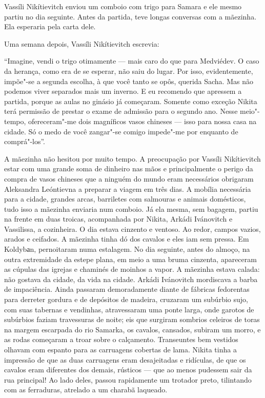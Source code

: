 Vassíli Nikítievitch enviou um comboio com trigo para Samara e ele mesmo
partiu no dia seguinte. Antes da partida, teve longas conversas com a
mãezinha. Ela esperaria pela carta dele.

Uma semana depois, Vassíli Nikítievitch escrevia:

``Imagine, vendi o trigo otimamente --- mais caro do que para Medviédev.
O caso da herança, como era de se esperar, não saiu do lugar. Por isso,
evidentemente, impõe"-se a segunda escolha, à que você tanto se opôs,
querida Sacha. Mas não podemos viver separados mais um inverno. E eu
recomendo que apressem a partida, porque as aulas no ginásio já
começaram. Somente como exceção Nikita terá permissão de prestar o exame
de admissão para o segundo ano. Nesse meio"-tempo, ofereceram"-me dois
magníficos vasos chineses --- isso para nossa casa na cidade. Só
o medo de você zangar"-se comigo impede"-me por enquanto de comprá"-los''.

A mãezinha não hesitou por muito tempo. A preocupação por Vassíli
Nikítievitch estar com uma grande soma de dinheiro nas mãos e
principalmente o perigo da compra de vasos chineses que a ninguém do
mundo eram necessários obrigaram Aleksandra Leóntievna a preparar a
viagem em três dias. A mobília necessária para a cidade, grandes arcas,
barriletes com salmouras e animais domésticos, tudo isso a mãezinha
enviaria num comboio. Já ela mesma, sem bagagem, partiu na frente em
duas troicas, acompanhada por Nikita, Arkádi Ivánovitch e Vassilissa, a
cozinheira. O dia estava cinzento e ventoso. Ao redor, campos vazios,
arados e ceifados. A mãezinha tinha dó dos cavalos e eles iam sem
pressa. Em Koldybаn, pernoitaram numa estalagem. No dia seguinte, antes
do almoço, na outra extremidade da estepe plana, em meio a uma bruma
cinzenta, apareceram as cúpulas das igrejas e chaminés de moinhos a
vapor. A mãezinha estava calada: não gostava da cidade, da vida na
cidade. Arkádi Ivánovitch mordiscava a barba de impaciência. Ainda
passaram demoradamente diante de fábricas fedorentas para derreter
gordura e de depósitos de madeira, cruzaram um subúrbio sujo, com
suas tabernas e vendinhas, atravessaram uma ponte larga, onde garotos de
subúrbios faziam travessuras de noite; eis que surgiram sombrios celeiros de
toras na margem escarpada do rio Samarka, os cavalos, cansados,
subiram um morro, e as rodas começaram a troar sobre o calçamento.
Transeuntes bem vestidos olhavam com espanto para as carruagens cobertas
de lama. Nikita tinha a impressão de que as duas carruagens eram
desajeitadas e ridículas, de que os cavalos eram diferentes dos demais,
rústicos --- que ao menos pudessem sair da rua principal! Ao lado deles,
passou rapidamente um trotador preto, tilintando com as ferraduras,
atrelado a um charabã laqueado.

